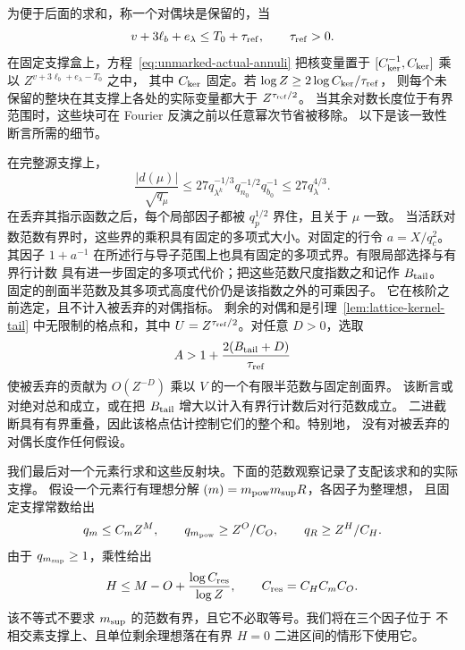 \documentclass[11pt,a4paper]{article}
\numberwithin{equation}{section}
\numberwithin{figure}{section}
\theoremstyle{definition}
\theoremstyle{remark}
\begin{document}
为便于后面的求和，称一个对偶块是保留的，当
\[
 v+3\ell_b+e_\lambda\le T_0+\tau_{\rm ref},
 \qquad \tau_{\rm ref}>0.
\]
在固定支撑盒上，方程~\eqref{eq:unmarked-actual-annuli} 把核变量置于
$[C_{\rm ker}^{-1},C_{\rm ker}]$ 乘以 $Z^{v+3\ell_b+e_\lambda-T_0}$ 之中，
其中 $C_{\rm ker}$ 固定。若 $\log Z\ge2\log C_{\rm ker}/\tau_{\rm ref}$，
则每个未保留的整块在其支撑上各处的实际变量都大于 $Z^{\tau_{\rm ref}/2}$。
当其余对数长度位于有界范围时，这些块可在 Fourier 反演之前以任意幂次节省被移除。
以下是该一致性断言所需的细节。

在完整源支撑上，
\[
 \frac{|d(\mu)|}{\sqrt{q_\mu}}
 \le27q_{\lambda^k}^{-1/3}q_{n_0}^{-1/2}q_{b_0}^{-1}
 \le27q_\lambda^{4/3}.
\]
在丢弃其指示函数之后，每个局部因子都被 $q_p^{1/2}$ 界住，且关于 $\mu$ 一致。
当活跃对数范数有界时，这些界的乘积具有固定的多项式大小。对固定的行令 $a=X/q_c^2$。
其因子 $1+a^{-1}$ 在所述行与导子范围上也具有固定的多项式界。有限局部选择与有界行计数
具有进一步固定的多项式代价；把这些范数尺度指数之和记作 $B_{\rm tail}$。
固定的剖面半范数及其多项式高度代价仍是该指数之外的可乘因子。
它在核阶之前选定，且不计入被丢弃的对偶指标。
剩余的对偶和是引理~\ref{lem:lattice-kernel-tail} 中无限制的格点和，其中
$U=Z^{\tau_{\rm ref}/2}$。对任意 $D>0$，选取
\[
 A>1+\frac{2(B_{\rm tail}+D)}{\tau_{\rm ref}}
\]
使被丢弃的贡献为 $O(Z^{-D})$ 乘以 $V$ 的一个有限半范数与固定剖面界。
该断言或对绝对总和成立，或在把 $B_{\rm tail}$ 增大以计入有界行计数后对行范数成立。
二进截断具有有界重叠，因此该格点估计控制它们的整个和。特别地，
没有对被丢弃的对偶长度作任何假设。

我们最后对一个元素行求和这些反射块。下面的范数观察记录了支配该求和的实际支撑。
假设一个元素行有理想分解 $(m)=m_{\rm pow}m_{\rm sup}R$，各因子为整理想，
且固定支撑常数给出
\[
 q_m\le C_mZ^M,\qquad q_{m_{\rm pow}}\ge Z^O/C_O,
 \qquad q_R\ge Z^H/C_H.
\]
由于 $q_{m_{\rm sup}}\ge1$，乘性给出
\begin{equation}\label{eq:actual-residual-row-dyad}
 H\le M-O+\frac{\log C_{\rm res}}{\log Z},
 \qquad C_{\rm res}=C_HC_mC_O.
\end{equation}
该不等式不要求 $m_{\rm sup}$ 的范数有界，且它不必取等号。我们将在三个因子位于
不相交素支撑上、且单位剩余理想落在有界 $H=0$ 二进区间的情形下使用它。
\end{document}
